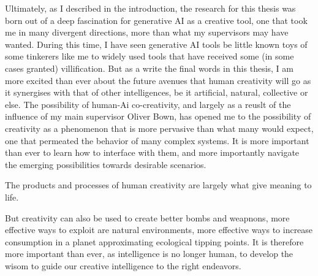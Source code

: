 Ultimately, as I described in the introduction, the research for this thesis was born out of a deep fascination for generative AI as a creative tool, one that took me in many divergent directions, more than what my supervisors may have wanted. During this time, I have seen generative AI tools be little known toys of some tinkerers like me to widely used tools that have received some (in some cases granted) villification. But as a write the final words in this thesis, I am more excited than ever about the future avenues that human creativity will go as it synergises with that of other intelligences, be it artificial, natural, collective or else. The possibility of human-Ai co-creativity, and largely as a reuslt of the influence of my main supervisor Oliver Bown, has opened me to the possibility of creativity as a phenomenon that is more pervasive than what many would expect, one that permeated the behavior of many complex systems. It is more important than ever to learn how to interface with them, and more importantly navigate the emerging possibilities towards desirable scenarios. 

The products and processes of human creativity are largely what give meaning to life. 

But creativity can also be used to create better bombs and weapnons, more effective ways to exploit are natural environments, more effective ways to increase consumption in a planet approximating ecological tipping points. It is therefore more important than ever, as intelligence is no longer human, to develop the wisom to guide our creative intelligence to the right endeavors. 